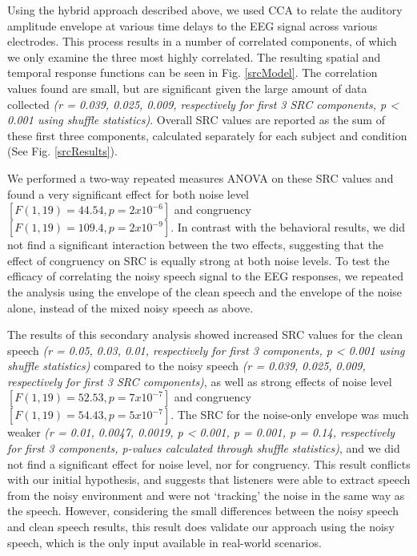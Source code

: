 \documentclass[10pt,letterpaper]{article}
\begin{document}
  Using the hybrid approach described above, we used CCA 
  to relate the auditory amplitude envelope at various time delays to the 
  EEG signal across various electrodes. This process results in a number of 
  correlated components, of which we only examine the three most highly 
  correlated. The resulting spatial and temporal 
  response functions can be seen in Fig. \ref{srcModel}. The correlation 
  values found are small, but are significant given the large amount of 
  data collected \textit{(r = 0.039, 0.025, 0.009, respectively for 
  first 3 SRC components, p < 0.001 using shuffle statistics)}.
  Overall SRC values are reported as the sum of these first three components, 
  calculated separately for each subject and condition 
  (See Fig. \ref{srcResults}).

  We performed a two-way repeated measures ANOVA on these SRC values and found 
  a very significant effect for both noise level 
  $[F(1, 19) = 44.54, p = 2 x 10^{-6}]$ and congruency 
  $[F(1, 19) = 109.4, p = 2 x 10^{-9}]$. In contrast with the behavioral 
  results, we did not find a significant interaction between the two effects,
  suggesting that the effect of congruency on SRC is equally strong at both 
  noise levels. 
  To test the efficacy of correlating the noisy speech signal to the EEG
  responses, we repeated the analysis using the envelope of the 
  clean speech and the envelope of the noise alone, 
  instead of the mixed noisy speech as above.

  The results of this secondary analysis showed increased 
  SRC values for the clean 
  speech \textit{(r = 0.05, 0.03, 0.01, respectively for first 3 components,
  p < 0.001 using shuffle statistics)} 
  compared to the noisy speech \textit{(r = 0.039, 0.025, 0.009, respectively
  for first 3 SRC components)}, as well as strong effects of noise level 
  $[F(1, 19) = 52.53, p = 7 x 10^{-7}]$ and congruency
  $[F(1, 19) = 54.43, p = 5 x 10^{-7}]$. The SRC for the noise-only envelope 
  was much weaker \textit{(r = 0.01, 0.0047, 0.0019, p < 0.001, p = 0.001, 
  p = 0.14, respectively for first 3 components, p-values calculated through
  shuffle statistics)}, and we did not find a significant effect for noise 
  level, nor for congruency. This result conflicts with our initial hypothesis,
  and suggests that listeners were able to extract speech from the noisy 
  environment and were not `tracking' the noise in the same way as the speech.
  However, considering the small differences between the noisy speech and 
  clean speech results, this result does validate our approach using the 
  noisy speech, which is the only input available in real-world scenarios.
\end{document}
